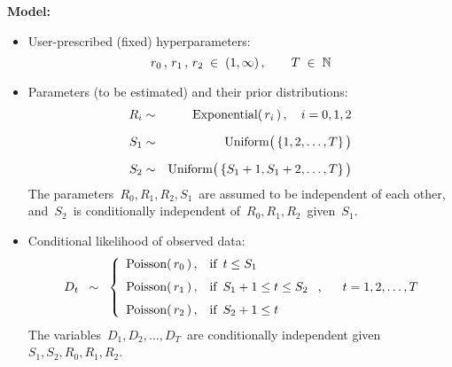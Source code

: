 \vskip 0.5cm
\noindent
\textbf{Model:}
\begin{itemize}
\item
	User-prescribed (fixed) hyperparameters:
	\begin{equation*}
	r_{0}\,,\, r_{1}\,,\, r_{2} \; \in \; (1,\infty)\,,
	\quad\quad
	T \; \in \; \mathbb{N}
	\end{equation*}
\item
	Parameters (to be estimated) and their prior distributions:
	\begin{eqnarray*}
	R_{i} & \sim & \textnormal{Exponential}(\,r_{i}\,)\,,\quad i = 0, 1, 2
	\\
	\overset{{\color{white}1}}{S_{1}} & \sim & \textnormal{Uniform}\!\left(\,\{1,2,\overset{{\color{white}1}}{\ldots}\,,T\}\,\right)
	\\
	\overset{{\color{white}1}}{S_{2}} & \sim & \textnormal{Uniform}\!\left(\,\{S_{1}+1,S_{1}+2,\overset{{\color{white}1}}{\ldots}\,,T\}\,\right)
	\end{eqnarray*}
	The parameters \,$R_{0},R_{1},R_{2},S_{1}$\, are assumed to be independent of each other, and
	\,$S_{2}$\, is conditionally independent of \,$R_{0},R_{1},R_{2}$\, given \,$S_{1}$.
\item
	Conditional likelihood of observed data:
	\begin{equation*}
	D_{t}
	\;\; \sim \;\;
		\left\{\begin{array}{cl}
		\textnormal{Poisson}(\,r_{0}\,)\,, & \textnormal{if \,$t \leq S_{1}$}
		\\
		\overset{{\color{white}1}}{\textnormal{Poisson}(\,r_{1}\,)}\,, & \textnormal{if \,$S_{1} + 1 \leq t \leq S_{2}$}
		\\
		\overset{{\color{white}1}}{\textnormal{Poisson}(\,r_{2}\,)}\,, & \textnormal{if \,$S_{2} + 1 \leq t$}
		\end{array}\right.,
	\quad\;\;
	t = 1, 2, \ldots, T
	\end{equation*}
	The variables \,$D_{1}, D_{2}, \ldots, D_{T}$\, are conditionally independent given \,$S_{1},S_{2},R_{0},R_{1},R_{2}$.
\end{itemize}



